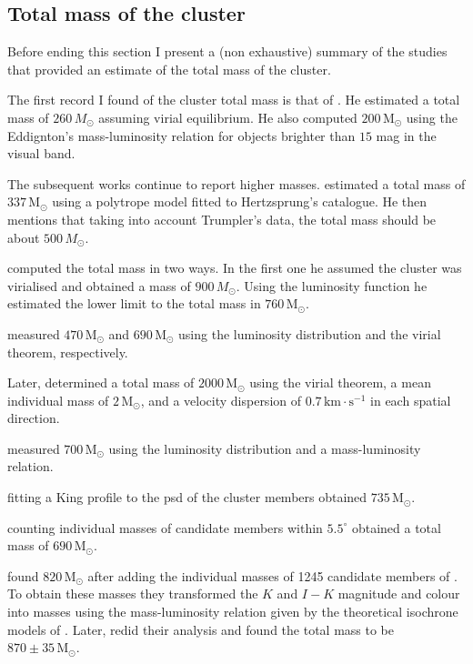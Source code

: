 \subsection{Total mass of the cluster}
Before ending this section I present a (non exhaustive) summary of the studies that provided an estimate of the total mass of the cluster.

The first record I found of the cluster total mass is that of \citet{1938AJ.....47...25T}. He estimated a total mass of $260 \,M_{\odot}$ assuming virial equilibrium. He also computed $200 \,\mathrm{M_{\odot}}$ using the Eddignton's mass-luminosity relation for objects brighter than $15$ mag in the visual band.

The subsequent works continue to report higher masses. \citet{1956MNRAS.116..296W} estimated a total mass of $337 \,\mathrm{M_{\odot}}$ using a polytrope model fitted to Hertzsprung's catalogue. He then mentions that taking into account Trumpler's data, the total mass should be about $500\,M_{\odot}$. 

\citet{Limber1962} computed the total mass in two ways. In the first one he assumed the cluster was virialised and obtained a mass of $900 \,M_{\odot}$. Using the luminosity function he estimated the lower limit to the total mass in $760 \,\mathrm{M_{\odot}}$. 

\citet{1970AJ.....75..563J} measured $470\,\mathrm{M_{\odot}}$ and $690\,\mathrm{M_{\odot}}$ using the luminosity distribution and the virial theorem, respectively. 

Later, \citet{1980IAUS...85..157V}  determined a total mass of $2000 \,\mathrm{M_{\odot}}$ using the virial theorem, a mean individual mass of $2\,\mathrm{M_{\odot}}$, and a velocity dispersion of $0.7\,\mathrm{km \cdot s^{-1}}$ in each spatial direction. 

\citet{1995JKAS...28...45L} measured $700 \,\mathrm{M_{\odot}}$ using the luminosity distribution and a mass-luminosity relation. 

\citet{Pinfield1998} fitting a King profile to the \gls{psd} of the cluster members obtained $735\,\mathrm{M_{\odot}}$. 

\citet{Adams2001} counting individual masses of candidate members within $5.5^{\circ}$ obtained a total mass of $690 \,\mathrm{M_{\odot}}$. 

\citet{Converse2008} found $820 \,\mathrm{M_{\odot}}$ after adding the individual masses of 1245  candidate members of \citet{Stauffer2007}. To obtain these masses they  transformed the $K$ and $I-K$ magnitude and colour into masses using the mass-luminosity relation given by the theoretical isochrone models of \citet{1998A&A...337..403B}. Later, \citet{Converse2010} redid their analysis and found the total mass to be $870\pm35\,\mathrm{M_{\odot}}$.


